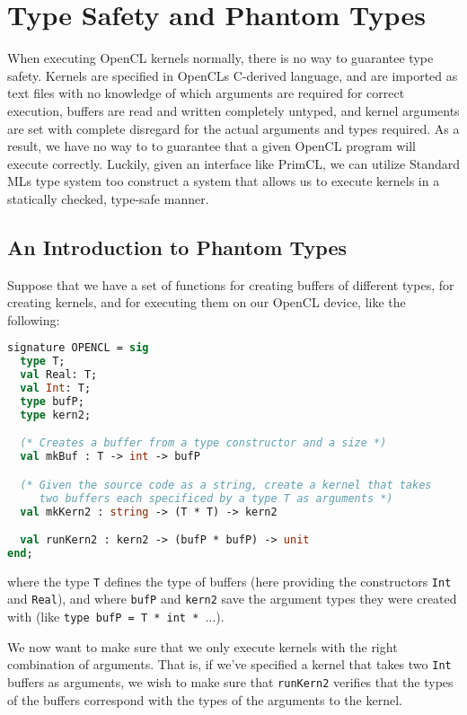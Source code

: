 \section{Type Safety and Phantom Types}

When executing OpenCL kernels normally, there is no way to guarantee
type safety. Kernels are specified in OpenCLs C-derived language, and
are imported as text files with no knowledge of which arguments are
required for correct execution, buffers are read and written
completely untyped, and kernel arguments are set with complete
disregard for the actual arguments and types required. As a result, we
have no way to to guarantee that a given OpenCL program will execute
correctly. Luckily, given an interface like PrimCL, we can utilize
Standard MLs type system too construct a system that allows us to
execute kernels in a statically checked, type-safe manner.

\subsection{An Introduction to Phantom Types}

Suppose that we have a set of functions for creating buffers of
different types, for creating kernels, and for executing them on our
OpenCL device, like the following:

\begin{lstlisting}[language=ML, caption=Signatures for a primitive
    SmlCL module,label=smlcl1,mathescape]
signature OPENCL = sig
  type T;
  val Real: T;
  val Int: T;
  type bufP;
  type kern2;

  (* Creates a buffer from a type constructor and a size *)
  val mkBuf : T -> int -> bufP

  (* Given the source code as a string, create a kernel that takes
     two buffers each specificed by a type T as arguments *)
  val mkKern2 : string -> (T * T) -> kern2

  val runKern2 : kern2 -> (bufP * bufP) -> unit
end;
\end{lstlisting}

where the type \texttt{T} defines the type of buffers (here providing
the constructors \texttt{Int} and \texttt{Real}), and where
\texttt{bufP} and \texttt{kern2} save the argument types they were
created with (like \texttt{type bufP = T * int * $\ldots$}).

We now want to make sure that we only execute kernels with the right
combination of arguments. That is, if we've specified a kernel that
takes two \texttt{Int} buffers as arguments, we wish to make sure
that \texttt{runKern2} verifies that the types of the buffers correspond with
the types of the arguments to the kernel.

